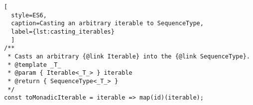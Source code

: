 \begin{lstlisting}[
  style=ES6, 
  caption=Casting an arbitrary iterable to SequenceType,
  label={lst:casting_iterables}
  ]
/**
 * Casts an arbitrary {@link Iterable} into the {@link SequenceType}.
 * @template _T_
 * @param { Iterable<_T_> } iterable
 * @return { SequenceType<_T_> }
 */
const toMonadicIterable = iterable => map(id)(iterable);
\end{lstlisting}
